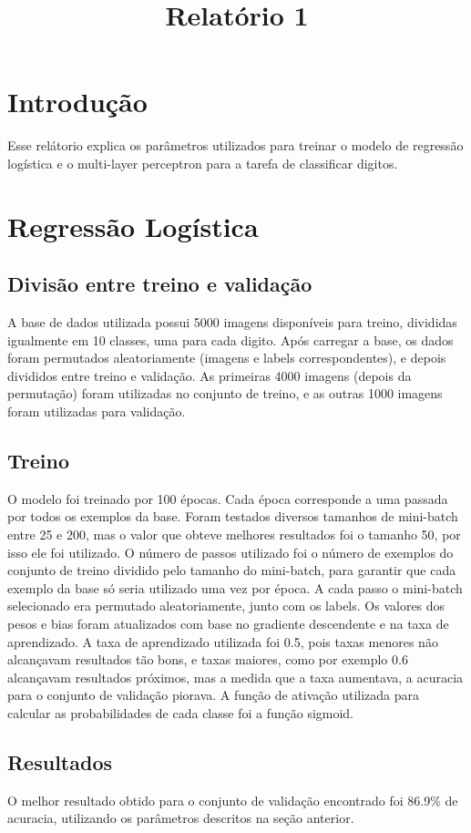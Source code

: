 \documentclass[conference]{IEEEtran}
\begin{document}
\title{Relatório 1}

\author{
}


\maketitle

\section{Introdução}
Esse relátorio explica os parâmetros utilizados para treinar o modelo de regressão logística e o multi-layer perceptron para a tarefa de classificar digitos.

\section{Regressão Logística}

\subsection{Divisão entre treino e validação}
A base de dados utilizada possui 5000 imagens disponíveis para treino, divididas igualmente em 10 classes, uma para cada digito. Após carregar a base, os dados foram permutados aleatoriamente (imagens e labels correspondentes), e depois divididos entre treino e validação. As primeiras 4000 imagens (depois da permutação) foram utilizadas no conjunto de treino, e as outras 1000 imagens foram utilizadas para validação.

\subsection{Treino}
O modelo foi treinado por 100 épocas. Cada época corresponde a uma passada por todos os exemplos da base. Foram testados diversos tamanhos de mini-batch entre 25 e 200, mas o valor que obteve melhores resultados foi o tamanho 50, por isso ele foi utilizado. O número de passos utilizado foi o número de exemplos do conjunto de treino dividido pelo tamanho do mini-batch, para garantir que cada exemplo da base só seria utilizado uma vez por época. A cada passo o mini-batch selecionado era permutado aleatoriamente, junto com os labels. Os valores dos pesos e bias foram atualizados com base no gradiente descendente e na taxa de aprendizado. A taxa de aprendizado utilizada foi 0.5, pois taxas menores não alcançavam resultados tão bons, e taxas maiores, como por exemplo 0.6 alcançavam resultados próximos, mas a medida que a taxa aumentava, a acuracia para o conjunto de validação piorava. A função de ativação utilizada para calcular as probabilidades de cada classe foi a função sigmoid.

\subsection{Resultados}
O melhor resultado obtido para o conjunto de validação encontrado foi 86.9\% de acuracia, utilizando os parâmetros descritos na seção anterior.
\end{document}
